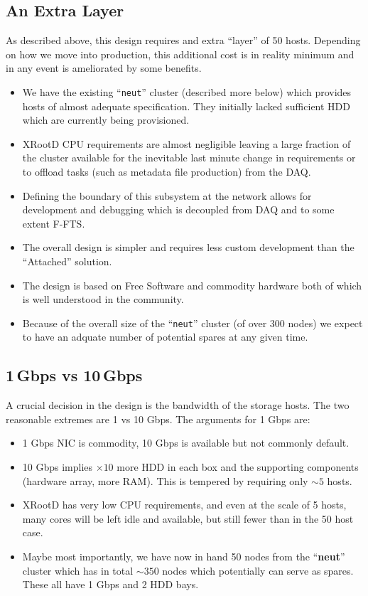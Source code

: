 \documentclass[pdftex,12pt,letter]{article}
\newcommand{\xrd}{XRootD\xspace}
\begin{document}
\subsection{An Extra Layer}

As described above, this design requires and extra ``layer'' of 50
hosts.  Depending on how we move into production, this additional cost
is in reality minimum and in any event is ameliorated by some benefits.

\begin{itemize}
\item We have the existing ``\texttt{neut}'' cluster (described more
  below) which provides hosts of almost adequate specification.  They
  initially lacked sufficient HDD which are currently being provisioned.
\item \xrd CPU requirements are almost negligible leaving a large
  fraction of the cluster available for the inevitable last minute
  change in requirements or to offload tasks (such as metadata file
  production) from the DAQ.
\item Defining the boundary of this subsystem at the network allows
  for development and debugging which is decoupled from DAQ and to
  some extent F-FTS.
\item The overall design is simpler and requires less custom
  development than the ``Attached'' solution.
\item The design is based on Free Software and commodity hardware both
  of which is well understood in the community.

\item Because of the overall size of the  ``\texttt{neut}'' cluster (of over 300 nodes)
we expect to have an adquate number of potential spares at any given time.

\end{itemize}

\subsection{1\,Gbps vs 10\,Gbps}

A crucial decision in the design is the bandwidth of the storage
hosts.  The two reasonable extremes are 1 vs 10 Gbps.  The arguments
for 1 Gbps are:

\begin{itemize}
\item 1 Gbps NIC is commodity, 10 Gbps is available but not commonly default.
\item 10 Gbps implies $\times 10$ more HDD in each box and the
  supporting components (hardware array, more RAM).  This is tempered
  by requiring only $\sim 5$ hosts.
\item \xrd has very low CPU requirements, and even at the scale of 5
  hosts, many cores will be left idle and available, but still fewer
  than in the 50 host case.
\item Maybe most importantly, we have now in hand 50 nodes from the
  ``\textbf{neut}'' cluster which has in total $\sim 350$ nodes which
  potentially can serve as spares.  These all have 1 Gbps and 2 HDD
  bays.
\end{itemize}
\end{document}
